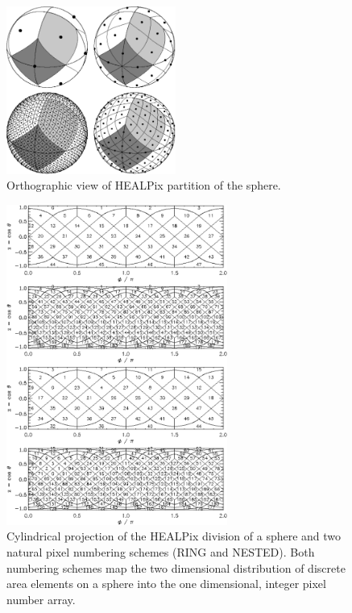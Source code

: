 \begin{figure}[!ht]
\begin{center}
\centerline{\includegraphics[height=5.5cm]{images/healpix4.pdf}}
\caption[Orthographic view of Healpix partition of the sphere]%
{\label{fig:healpix_sphere}%
Orthographic view of HEALPix partition of the sphere.}
\end{center}
\end{figure}

\begin{figure} [!ht]
\begin{center}
\centerline{\includegraphics[height=10.5cm]{images/healpix2d.pdf}}
\caption[Cylindrical projection]%
{\label{fig:healpix_numbering}%
Cylindrical projection of the HEALPix division of a
sphere and two natural pixel numbering schemes (RING and NESTED). 
Both numbering schemes map the two dimensional 
distribution
of discrete area elements on a sphere into the one dimensional, 
integer pixel number array.
}
\end{center}
\end{figure}